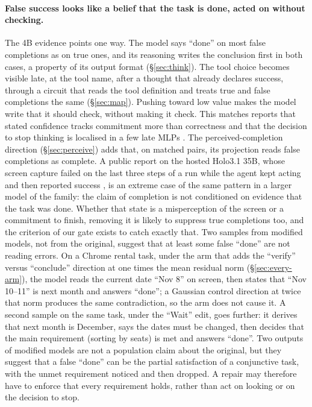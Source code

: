 \paragraph{False success looks like a belief that the task is done, acted on without checking.} The 4B evidence points one way. The model says ``done'' on most false completions as on true ones, and its reasoning writes the conclusion first in both cases, a property of its output format (\S\ref{sec:think}). The tool choice becomes visible late, at the tool name, after a thought that already declares success, through a circuit that reads the tool definition and treats true and false completions the same (\S\ref{sec:map}). Pushing toward low value makes the model write that it should check, without making it check. This matches reports that stated confidence tracks commitment more than correctness \citep{kumaran2026commit} and that the decision to stop thinking is localised in a few late MLPs \citep{dutta2026termination}. The perceived-completion direction (\S\ref{sec:perceive}) adds that, on \pcMatchN{} matched pairs, its projection reads false completions as complete. A public report on the hosted Holo3.1 35B, whose screen capture failed on the last three steps of a run while the agent kept acting and then reported success \citep{holodesktop2026issue15}, is an extreme case of the same pattern in a larger model of the family: the claim of completion is not conditioned on evidence that the task was done. Whether that state is a misperception of the screen or a commitment to finish, removing it is likely to suppress true completions too, and the \fsm{} criterion of our gate exists to catch exactly that. Two samples from modified models, not from the original, suggest that at least some false ``done'' are not reading errors. On a Chrome rental task, under the arm that adds the ``verify'' versus ``conclude'' direction at one times the mean residual norm (\S\ref{sec:every-arm}), the model reads the current date ``Nov 8'' on screen, then states that ``Nov 10--11'' is next month and answers ``done''; a Gaussian control direction at twice that norm produces the same contradiction, so the arm does not cause it. %
A second sample on the same task, under the ``Wait'' edit, goes further: it derives that next month is December, says the dates must be changed, then decides that the main requirement (sorting by seats) is met and answers ``done''. %
Two outputs of modified models are not a population claim about the original, but they suggest that a false ``done'' can be the partial satisfaction of a conjunctive task, with the unmet requirement noticed and then dropped. A repair may therefore have to enforce that every requirement holds, rather than act on looking or on the decision to stop.

